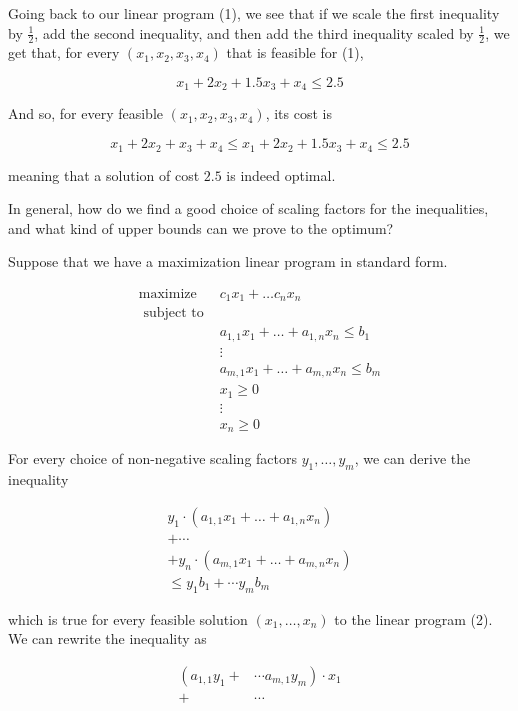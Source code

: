 Going back to our linear program (1), we see that if we scale the first inequality by $\frac{1}{2}$, add the second inequality, and then add the third inequality scaled by $\frac{1}{2}$, we get that, for every $\left(x_{1}, x_{2}, x_{3}, x_{4}\right)$ that is feasible for (1),

$$
x_{1}+2 x_{2}+1.5 x_{3}+x_{4} \leq 2.5
$$

And so, for every feasible $\left(x_{1}, x_{2}, x_{3}, x_{4}\right)$, its cost is

$$
x_{1}+2 x_{2}+x_{3}+x_{4} \leq x_{1}+2 x_{2}+1.5 x_{3}+x_{4} \leq 2.5
$$

meaning that a solution of cost $2.5$ is indeed optimal.

In general, how do we find a good choice of scaling factors for the inequalities, and what kind of upper bounds can we prove to the optimum?

Suppose that we have a maximization linear program in standard form.

$$
\begin{array}{ll}
\operatorname{maximize} & c_{1} x_{1}+\ldots c_{n} x_{n} \\
\text { subject to } & \\
& a_{1,1} x_{1}+\ldots+a_{1, n} x_{n} \leq b_{1} \\
& \vdots \\
& a_{m, 1} x_{1}+\ldots+a_{m, n} x_{n} \leq b_{m} \\
& x_{1} \geq 0 \\
& \vdots \\
& x_{n} \geq 0
\end{array}
$$

For every choice of non-negative scaling factors $y_{1}, \ldots, y_{m}$, we can derive the inequality

$$
\begin{gathered}
y_{1} \cdot\left(a_{1,1} x_{1}+\ldots+a_{1, n} x_{n}\right) \\
+\cdots \\
+y_{n} \cdot\left(a_{m, 1} x_{1}+\ldots+a_{m, n} x_{n}\right) \\
\leq y_{1} b_{1}+\cdots y_{m} b_{m}
\end{gathered}
$$

which is true for every feasible solution $\left(x_{1}, \ldots, x_{n}\right)$ to the linear program (2). We can rewrite the inequality as

$$
\begin{aligned}
\left(a_{1,1} y_{1}+\right.&\left.\cdots a_{m, 1} y_{m}\right) \cdot x_{1} \\
+& \cdots
\end{aligned}
$$

